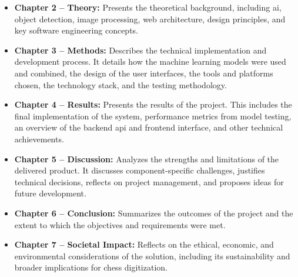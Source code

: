 \begin{itemize}
    
    \item \textbf{Chapter 2 -- Theory:} Presents the theoretical background, including \gls{ai}, object detection, image processing, web architecture, design principles, and key software engineering concepts.
    
    \item \textbf{Chapter 3 -- Methods:} Describes the technical implementation and development process. It details how the machine learning models were used and combined, the design of the user interfaces, the tools and platforms chosen, the technology stack, and the testing methodology.
    
    \item \textbf{Chapter 4 -- Results:} Presents the results of the project. This includes the final implementation of the system, performance metrics from model testing, an overview of the backend \gls{api} and frontend interface, and other technical achievements.
    
    \item \textbf{Chapter 5 -- Discussion:} Analyzes the strengths and limitations of the delivered product. It discusses component-specific challenges, justifies technical decisions, reflects on project management, and proposes ideas for future development.
    
    \item \textbf{Chapter 6 -- Conclusion:} Summarizes the outcomes of the project and the extent to which the objectives and requirements were met.

    \item \textbf{Chapter 7 -- Societal Impact:} Reflects on the ethical, economic, and environmental considerations of the solution, including its sustainability and broader implications for chess digitization.
    
\end{itemize}